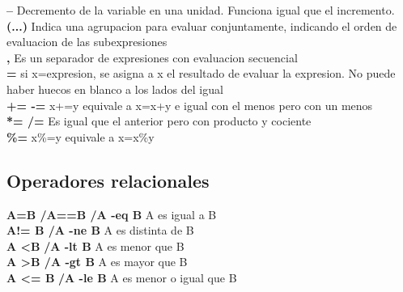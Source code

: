 \documentclass[11pt]{article}
\begin{document}
 \textbf{--} \hspace{2cm}  Decremento de la variable en una unidad. Funciona igual que el incremento.\\
 
 \textbf{(...)} \hspace{2cm}  Indica una agrupacion para evaluar conjuntamente, indicando el orden de evaluacion de las subexpresiones\\
 
 \textbf{,} \hspace{2cm}  Es un separador de expresiones con evaluacion secuencial\\
 
 \textbf{=} \hspace{2cm}  si x=expresion, se asigna a x el resultado de evaluar la expresion. No puede haber huecos en blanco a los lados del igual\\
 
 \textbf{+= -=} \hspace{2cm} x+=y equivale a x=x+y e igual con el menos pero con un menos \\
 
 \textbf{*= /=} \hspace{2cm}  Es igual que el anterior pero con producto y cociente \\
 
 \textbf{\%=} \hspace{2cm}  x\%=y equivale a x=x\%y\\
 
 
 \subsection{Operadores relacionales}
 
 \textbf{A=B /A==B /A -eq B} \hspace{2cm}  A es igual a B\\
 
 \textbf{A!= B /A -ne B } \hspace{2cm}  A es distinta de B\\
 
\textbf{A \textless B} \textbf{/A -lt B} \hspace{2cm}  A es menor que B\\
  
\textbf{A \textgreater B  /A -gt B}\hspace{2cm}  A es mayor que B\\ 

\textbf{A \textless = B} \textbf{/A -le B} \hspace{2cm}  A es menor o igual que B\\
\end{document}
